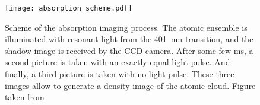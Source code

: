 \vspace{1cm}

\begin{figure}[!htbp]\centering
	\texttt{[image: absorption\_scheme.pdf]}
	\caption[Scheme of the absorption imaging process]{Scheme of the absorption imaging process. The atomic ensemble is illuminated with resonant light from the \SI{401}{\nano\meter} transition, and the shadow image is received by the CCD camera. After some few \si{\milli\second}, a second picture is taken with an exactly equal light pulse. And finally, a third picture is taken with no light pulse. These three images allow to generate a density image of the atomic cloud. Figure taken from \cite{Brammer2016}}\label{fig:absorption_scheme}
\end{figure}


